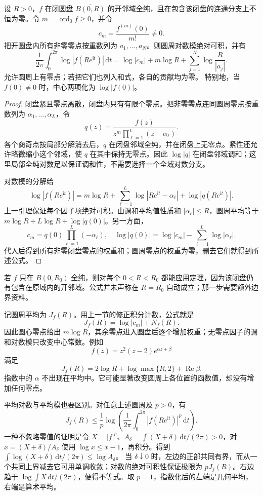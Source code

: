 \begin{theorem}[Jensen]\label{b3:thm:18-jensen}
设 \(R>0\)，\(f\) 在闭圆盘 \(\overline{B(0,R)}\) 的开邻域全纯，且在包含该闭盘的连通分支上不恒为零。令 \(m=\operatorname{ord}_0f\ge0\)，并令
\[
 c_m=\frac{f^{(m)}(0)}{m!}\ne0.
\]
把开圆盘内所有非零零点按重数列为 \(a_1,\ldots,a_N\)。则圆周对数模绝对可积，并有
\begin{equation}\label{b3:eq:18-jensen}
 \frac1{2\pi}\int_0^{2\pi}\log|f(Re^{\mathrm it})|\,\mathrm dt
 =\log|c_m|+m\log R+\sum_{j=1}^N\log\frac R{|a_j|}.
\end{equation}
允许圆周上有零点；若把它们也列入和式，各自的贡献均为零。
特别地，当 \(f(0)\ne0\) 时，中心两项化为 \(\log|f(0)|\)。
\end{theorem}
\begin{proof}
闭盘紧且零点离散，闭盘内只有有限个零点。把非零零点连同圆周零点按重数列为 \(\alpha_1,\ldots,\alpha_L\)，令
\[
 q(z)=\frac{f(z)}{z^m\prod_{\ell=1}^L(z-\alpha_\ell)}.
\]
各个商奇点按局部分解消去后，\(q\) 在闭盘邻域全纯，并在闭盘上无零点。紧性还允许略微缩小这个邻域，使 \(q\) 在其中保持无零点。因此 \(\log|q|\) 在闭盘邻域调和；这里局部全纯对数足以保证调和性，不需要选择一个全域对数分支。

对数模的分解给
\[
 \log|f(Re^{\mathrm it})|
 =m\log R+\sum_{\ell=1}^L\log|Re^{\mathrm it}-\alpha_\ell|
       +\log|q(Re^{\mathrm it})|.
\]
上一引理保证每个因子项绝对可积。由调和平均值性质和
\(|\alpha_\ell|\le R\)，圆周平均等于
\(m\log R+L\log R+\log|q(0)|\)。另一方面，
\[
 c_m=q(0)\prod_{\ell=1}^L(-\alpha_\ell),\quad
 \log|q(0)|=\log|c_m|-\sum_{\ell=1}^L\log|\alpha_\ell|.
\]
代入后得到所有非零闭盘零点的权重和；圆周零点的权重为零，删去它们就得到所述公式。
\end{proof}

若 \(f\) 只在 \(B(0,R_0)\) 全纯，则对每个 \(0<R<R_0\) 都能应用定理，因为该闭盘仍有包含在原域内的开邻域。公式并未声称在 \(R=R_0\) 自动成立；那一步需要额外边界资料。

\ProseParagraphBreak
记圆周平均为 \(J_f(R)\)。用上一节的修正积分计数，公式就是
\[
 J_f(R)=\log|c_m|+N_f(R).
\]
因此圆心零点给出 \(m\log R\)，其余零点进入圆盘后逐个增加权重；无零点因子的调和对数模只改变中心常数。例如
\[
 f(z)=z^2(z-2)e^{\alpha z+\beta}
\]
满足
\[
 J_f(R)=2\log R+\log\max\{R,2\}+\operatorname{Re}\beta.
\]
指数中的 \(\alpha\) 不出现在平均中。它可能显著改变圆周上各位置的函数值，却没有增加任何零点。

\ProseParagraphBreak
平均对数与平均模也要区别。对任意上述圆周及 \(p>0\)，有
\begin{equation}\label{b3:eq:18-mean-power-bound}
 J_f(R)\le\frac1p\log\left(
     \frac1{2\pi}\int_0^{2\pi}|f(Re^{\mathrm it})|^p\,\mathrm dt\right).
\end{equation}
一种不忽略零值的证明是令 \(X=|f|^p\)、\(A_\delta=\int(X+\delta)\,\mathrm dt/(2\pi)>0\)，对 \(x=(X+\delta)/A_\delta\) 使用 \(\log x\le x-1\)，再积分。得到
\(\int\log(X+\delta)\,\mathrm dt/(2\pi)\le\log A_\delta\)。
当 \(\delta\downarrow0\) 时，左边的正部共同有界，而从一个共同上界减去它可用单调收敛；对数的绝对可积性保证极限为 \(pJ_f(R)\)。右边趋于 \(\log\int X\,\mathrm dt/(2\pi)\)，便得不等式。取 \(p=1\)，指数化后的左端是几何平均，右端是算术平均。

